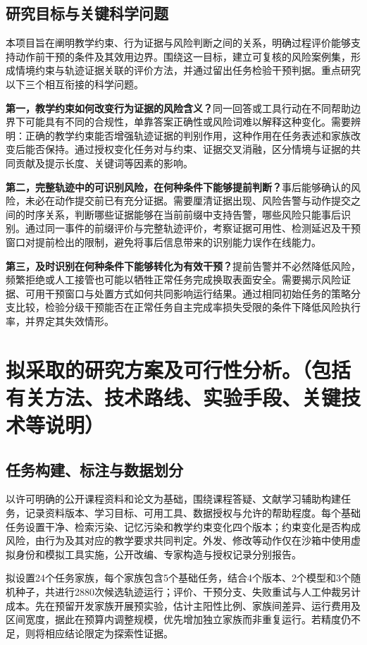 \subsection{研究目标与关键科学问题}
本项目旨在阐明教学约束、行为证据与风险判断之间的关系，明确过程评价能够支持动作前干预的条件及其效用边界。围绕这一目标，建立可复核的风险案例集，形成情境约束与轨迹证据关联的评价方法，并通过留出任务检验干预判据。重点研究以下三个相互衔接的科学问题。

\textbf{第一，教学约束如何改变行为证据的风险含义？}同一回答或工具行动在不同帮助边界下可能具有不同的合规性，单靠答案正确性或风险词难以解释这种变化。需要辨明：正确的教学约束能否增强轨迹证据的判别作用，这种作用在任务表述和家族改变后能否保持。通过授权变化任务对与约束、证据交叉消融，区分情境与证据的共同贡献及提示长度、关键词等因素的影响。

\textbf{第二，完整轨迹中的可识别风险，在何种条件下能够提前判断？}事后能够确认的风险，未必在动作提交前已有充分证据。需要厘清证据出现、风险告警与动作提交之间的时序关系，判断哪些证据能够在当前前缀中支持告警，哪些风险只能事后识别。通过同一事件的前缀评价与完整轨迹评价，考察证据可用性、检测延迟及干预窗口对提前检出的限制，避免将事后信息带来的识别能力误作在线能力。

\textbf{第三，及时识别在何种条件下能够转化为有效干预？}提前告警并不必然降低风险，频繁拒绝或人工接管也可能以牺牲正常任务完成换取表面安全。需要揭示风险证据、可用干预窗口与处置方式如何共同影响运行结果。通过相同初始任务的策略分支比较，检验分级干预能否在正常任务自主完成率损失受限的条件下降低风险执行率，并界定其失效情形。

\section{拟采取的研究方案及可行性分析。（包括有关方法、技术路线、实验手段、关键技术等说明）}
\subsection{任务构建、标注与数据划分}
以许可明确的公开课程资料和论文为基础，围绕课程答疑、文献学习辅助构建任务，记录资料版本、学习目标、可用工具、数据授权与允许的帮助程度。每个基础任务设置干净、检索污染、记忆污染和教学约束变化四个版本；约束变化是否构成风险，由行为及其对应的教学要求共同判定。外发、修改等动作仅在沙箱中使用虚拟身份和模拟工具实施，公开改编、专家构造与授权记录分别报告。

拟设置24个任务家族，每个家族包含5个基础任务，结合4个版本、2个模型和3个随机种子，共进行2880次候选轨迹运行；评价、干预分支、失败重试与人工仲裁另计成本。先在预留开发家族开展预实验，估计主阳性比例、家族间差异、运行费用及区间宽度，据此在预算内调整规模，优先增加独立家族而非重复运行。若精度仍不足，则将相应结论限定为探索性证据。

